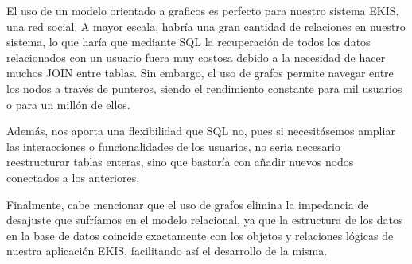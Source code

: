 El uso de un modelo orientado a graficos es perfecto para nuestro sistema EKIS, una red social. A mayor escala, habría una gran cantidad de relaciones en nuestro sistema, lo que haría que mediante SQL la recuperación de todos los datos relacionados con un usuario fuera muy costosa debido a la necesidad de hacer muchos JOIN entre tablas. Sin embargo, el uso de grafos permite navegar entre los nodos a través de punteros, siendo el rendimiento constante para mil usuarios o para un millón de ellos.

Además, nos aporta una flexibilidad que SQL no, pues si necesitásemos ampliar las interacciones o funcionalidades de los usuarios, no seria necesario reestructurar tablas enteras, sino que bastaría con añadir nuevos nodos conectados a los anteriores.

Finalmente, cabe mencionar que el uso de grafos elimina la impedancia de desajuste que sufríamos en el modelo relacional, ya que la estructura de los datos en la base de datos coincide exactamente con los objetos y relaciones lógicas de nuestra aplicación EKIS, facilitando así el desarrollo de la misma.